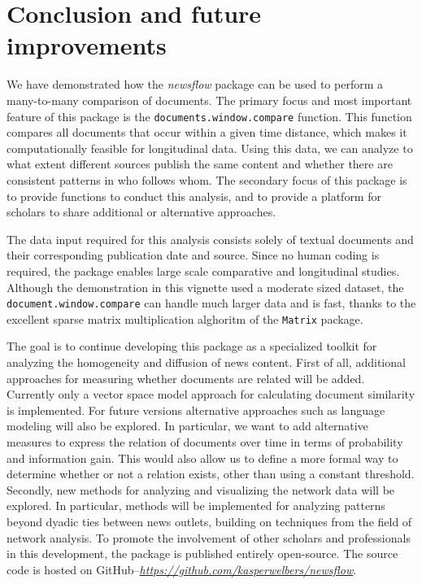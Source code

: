 \documentclass[]{article}
\begin{document}
\section{Conclusion and future
improvements}\label{conclusion-and-future-improvements}

We have demonstrated how the \emph{newsflow} package can be used to
perform a many-to-many comparison of documents. The primary focus and
most important feature of this package is the
\texttt{documents.window.compare} function. This function compares all
documents that occur within a given time distance, which makes it
computationally feasible for longitudinal data. Using this data, we can
analyze to what extent different sources publish the same content and
whether there are consistent patterns in who follows whom. The secondary
focus of this package is to provide functions to conduct this analysis,
and to provide a platform for scholars to share additional or
alternative approaches.

The data input required for this analysis consists solely of textual
documents and their corresponding publication date and source. Since no
human coding is required, the package enables large scale comparative
and longitudinal studies. Although the demonstration in this vignette
used a moderate sized dataset, the \texttt{document.window.compare} can
handle much larger data and is fast, thanks to the excellent sparse
matrix multiplication alghoritm of the \texttt{Matrix} package.

The goal is to continue developing this package as a specialized toolkit
for analyzing the homogeneity and diffusion of news content. First of
all, additional approaches for measuring whether documents are related
will be added. Currently only a vector space model approach for
calculating document similarity is implemented. For future versions
alternative approaches such as language modeling will also be explored.
In particular, we want to add alternative measures to express the
relation of documents over time in terms of probability and information
gain. This would also allow us to define a more formal way to determine
whether or not a relation exists, other than using a constant threshold.
Secondly, new methods for analyzing and visualizing the network data
will be explored. In particular, methods will be implemented for
analyzing patterns beyond dyadic ties between news outlets, building on
techniques from the field of network analysis. To promote the
involvement of other scholars and professionals in this development, the
package is published entirely open-source. The source code is hosted on
GitHub--\emph{\url{https://github.com/kasperwelbers/newsflow}}.
\end{document}
